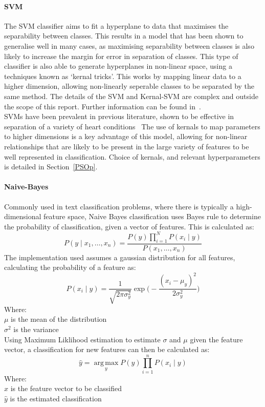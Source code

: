 \documentclass[titlepage, 12pt]{scrartcl} \usepackage{enumitem}
\DeclareMathOperator*{\argmax}{arg\,max}
\begin{document}
\paragraph{SVM}\label{SVM}
The SVM classifier aims to fit a hyperplane to data that maximises the
separability between classes. This results in a model that has been shown to
generalise well in many cases, as maximising separability between classes is
also likely to increase the margin for error in separation of classes. This
type of classifier is also able to generate hyperplanes in non-linear space,
using a techniques known as `kernal tricks'. This works by mapping linear data
to a higher dimension, allowing non-linearly seperable classes to be separated
by the same method. The details of the SVM and Kernal-SVM are complex and
outside the scope of this report. Further information can be found
in~\parencite[p.187]{Tobergte2013a}.\\
SVMs have been prevalent in previous literature, shown to be effective in
separation of a variety of heart conditions~\parencite{Ari2010} The use of
kernals to map parameters to higher dimensions is a key advantage of this
model, allowing for non-linear relationships that are likely to be present in
the large variety of features to be well represented in classification. Choice
of kernals, and relevant hyperparameters is detailed in Section~\ref{PSOp}.

\paragraph{Naive-Bayes}
Commonly used in text classification problems, where there is typically a
high-dimensional feature space, Naive Bayes classification uses Bayes rule to
determine the probability of classification, given a vector of features. This
is calculated as:
\begin{equation}
    P(y\mid x_1,\ldots,x_n)=\frac{P(y)\prod\limits_{i=1}^{N}P(x_i\mid y)}{P(x_1,\ldots,x_n)}
\end{equation}
The implementation used assumes a gaussian distribution for all features,
calculating the probability of a feature as:
\begin{equation}
    P(x_i\mid y)=\frac{1}{\sqrt{2\pi
    \sigma_y^2}}\exp\bigg(-\frac{(x_i-\mu_y)^2}{2\sigma^2_y}\bigg)
\end{equation}
Where:\\
$\mu$ is the mean of the distribution\\
$\sigma^2$ is the variance\\
Using Maximum Liklihood estimation to estimate $\sigma$ and $\mu$ given the
feature vector, a classification for new features can then be calculated as:
\begin{equation}
    \hat{y}=\argmax\limits_y P(y)\prod\limits_{i=1}^nP(x_i\mid y)
\end{equation}
Where:\\
$x$ is the feature vector to be classified\\
$\hat{y}$ is the estimated classification\\
\end{document}
